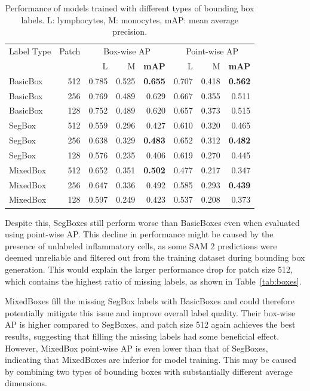 \begin{table}[h]
    \centering
    \begin{tabular}{lr|rrrrrr}
        \toprule
        Label Type & Patch & \multicolumn{3}{c}{Box-wise AP} & \multicolumn{3}{c}{Point-wise AP} \\
        & & L & M & \textbf{mAP} & L & M & \textbf{mAP} \\
        \midrule
        BasicBox & 512 & 0.785 & 0.525 & \textbf{0.655} & 0.707 & 0.418 & \textbf{0.562} \\
        BasicBox & 256  & 0.769 & 0.489 & 0.629 & 0.667 & 0.355 & 0.511 \\
        BasicBox & 128  & 0.752 & 0.489 & 0.620 & 0.657 & 0.373 & 0.515 \\
        \midrule
        SegBox & 512 & 0.559 & 0.296 & 0.427 & 0.610 & 0.320 & 0.465 \\
        SegBox & 256 & 0.638 & 0.329 & \textbf{0.483} & 0.652 & 0.312 & \textbf{0.482} \\
        SegBox & 128 & 0.576 & 0.235 & 0.406 & 0.619 & 0.270 & 0.445 \\
        \midrule
        MixedBox & 512 & 0.652 & 0.351 & \textbf{0.502} & 0.477 & 0.217 & 0.347 \\
        MixedBox & 256 & 0.647 & 0.336 & 0.492 & 0.585 & 0.293 & \textbf{0.439} \\
        MixedBox & 128 & 0.597 & 0.249 & 0.423 & 0.537 & 0.208 & 0.373 \\
        \bottomrule
    \end{tabular}
    \caption{Performance of models trained with different types of bounding box labels. L: lymphocytes, M: monocytes, mAP: mean average precision.}
    \label{tab:exp_labels}
\end{table}

Despite this, SegBoxes still perform worse than BasicBoxes even when evaluated using point-wise AP. This decline in performance might be caused by the presence of unlabeled inflammatory cells, as some SAM 2 predictions were deemed unreliable and filtered out from the training dataset during bounding box generation. This would explain the larger performance drop for patch size 512, which contains the highest ratio of missing labels, as shown in Table~\ref{tab:boxes}.

MixedBoxes fill the missing SegBox labels with BasicBoxes and could therefore potentially mitigate this issue and improve overall label quality. Their box-wise AP is higher compared to SegBoxes, and patch size 512 again achieves the best results, suggesting that filling the missing labels had some beneficial effect. However, MixedBox point-wise AP is even lower than that of SegBoxes, indicating that MixedBoxes are inferior for model training. This may be caused by combining two types of bounding boxes with substantially different average dimensions.

